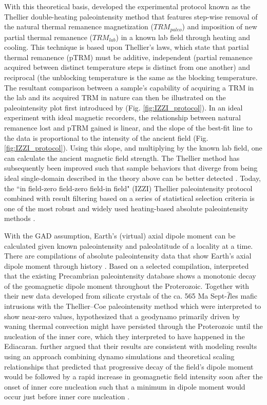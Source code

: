 With this theoretical basis, \cite{Thellier1959a} developed the experimental protocol known as the Thellier double-heating paleointensity method that features step-wise removal of the natural thermal remanence magnetization ($TRM_{paleo}$) and imposition of new partial thermal remanence ($TRM_{lab}$) in a known lab field through heating and cooling. This technique is based upon Thellier’s laws, which state that partial thermal remanence (pTRM) must be additive, independent (partial remanence acquired between distinct temperature steps is distinct from one another) and reciprocal (the unblocking temperature is the same as the blocking temperature. The resultant comparison between a sample's capability of acquiring a TRM in the lab and its acquired TRM in nature can then be illustrated on the paleointensity plot first introduced by \cite{Arai1963a} (Fig. \ref{fig:IZZI_protocol}). In an ideal experiment with ideal magnetic recorders, the relationship between natural remanence lost and pTRM gained is linear, and the slope of the best-fit line to the data is proportional to the intensity of the ancient field (Fig. \ref{fig:IZZI_protocol}). Using this slope, and multiplying by the known lab field, one can calculate the ancient magnetic field strength. The Thellier method has subsequently been improved such that sample behaviors that diverge from being ideal single-domain described in the theory above can be better detected \citep[e.g.][]{Coe1967b, Riisager2001a, Yu2003a, Yu2004a, Yu2006a}. Today, the ``in field-zero field-zero field-in field" (IZZI) Thellier paleointensity protocol combined with result filtering based on a series of statistical selection criteria is one of the most robust and widely used heating-based absolute paleointensity methods \citep{Yu2004a}. 

With the GAD assumption, Earth's (virtual) axial dipole moment can be calculated given known paleointensity and paleolatitude of a locality at a time. There are compilations of absolute paleointensity data that show Earth's axial dipole moment through history \citep[e.g.][]{Veikkolainen2014b, Bono2022b}. Based on a selected compilation, \citep{Bono2019a} interpreted that the existing Precambrian paleointensity database shows a monotonic decay of the geomagnetic dipole moment throughout the Proterozoic. Together with their new data developed from silicate crystals of the ca. 565 Ma Sept-$\hat{I}$les mafic intrusions with the Thellier–Coe paleointensity method which were interpreted to show near-zero values, \cite{Bono2019a} hypothesized that a geodynamo primarily driven by waning thermal convection might have persisted through the Proterozoic until the nucleation of the inner core, which they interpreted to have happened in the Ediacaran. \cite{Bono2019a} further argued that their results are consistent with modeling results using an approach combining dynamo simulations and theoretical scaling relationships that predicted that progressive decay of the field’s dipole moment would be followed by a rapid increase in geomagnetic field intensity soon after the onset of inner core nucleation such that a minimum in dipole moment would occur just before inner core nucleation \citep{Driscoll2016a}. 

